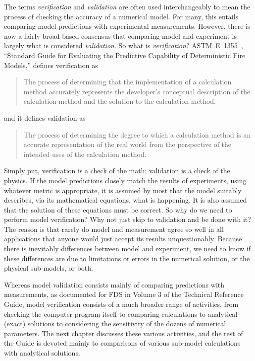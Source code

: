 \documentclass[11pt]{book}
\begin{document}
The terms {\em verification} and {\em validation} are often used interchangeably to mean the process of checking the
accuracy of a numerical model. For many, this entails comparing model predictions with experimental measurements. However,
there is now a fairly broad-based consensus that comparing model and experiment is largely what is considered {\em validation}. So what is
{\em verification}? ASTM~E~1355~\cite{ASTM:E1355}, ``Standard Guide for
Evaluating the Predictive Capability of Deterministic Fire Models,'' defines verification as
\begin{quote}
The process of determining that the implementation of a calculation method accurately
represents the developer's conceptual description of the calculation method and the solution to the calculation method.
\end{quote}
and it defines validation as
\begin{quote}
The process of determining the degree to which a calculation method is an accurate representation of the real world
from the perspective of the intended uses of the calculation method.
\end{quote}
Simply put, verification is a check of the math; validation is a check of the physics. If the model predictions closely match
the results of experiments, using whatever metric is appropriate, it is assumed by most that the model suitably describes, via
its mathematical equations, what is happening. It is also assumed that the solution of these equations must be correct. So why do
we need to perform model verification? Why not just skip to validation and be done with it? The reason is that rarely do model and
measurement agree so well in all applications that anyone would just accept its results unquestionably. Because there is
inevitably differences between model and experiment, we need to know if these differences are due to limitations or errors in
the numerical solution, or the physical sub-models, or both.

Whereas model validation consists mainly of comparing predictions with measurements, as documented for FDS in Volume 3 of the
Technical Reference Guide, model verification consists of a much broader range of activities, from checking the computer program
itself to comparing calculations to analytical (exact) solutions to considering the sensitivity of the dozens of numerical
parameters. The next chapter discusses these various activities, and the rest of the Guide is devoted mainly to comparisons of
various sub-model calculations with analytical solutions.
\end{document}
